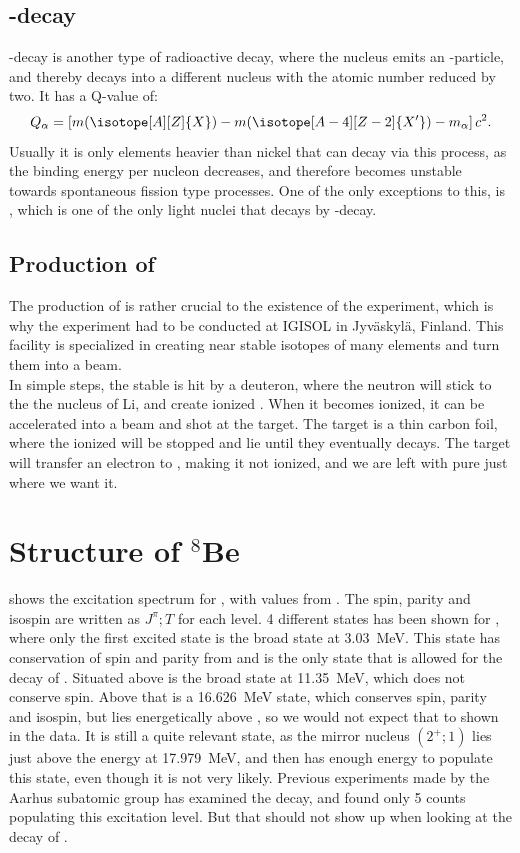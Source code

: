 \subsection{\al-decay}
\al-decay is another type of radioactive decay, where the nucleus emits an \al-particle, and thereby decays into a different nucleus with the atomic number reduced by two.  
It has a Q-value of:
\begin{equation}
Q_\alpha =  \left[ m (\isotope[A][Z]{X}) - m(\isotope[A-4][Z-2]{X'})  	- m_\alpha	 \right] c^2.
\end{equation}
Usually it is only elements heavier than nickel that can decay via this process, as the binding energy per nucleon decreases, and therefore becomes unstable towards spontaneous fission type processes. 
One of the only exceptions to this, is \ber, which is one of the only light nuclei that decays by \al-decay.

\subsection{Production of \li}
The production of \li is rather crucial to the existence of the experiment, which is why the experiment had to be conducted at IGISOL in Jyväskylä, Finland. This facility is specialized in creating near stable isotopes of many elements and turn them into a beam. \\
In simple steps, the stable  is hit by a deuteron, where the neutron will stick to the the nucleus of \isotope[7]Li, and create ionized \li. When it becomes ionized, it can be accelerated into a beam and shot at the target. The target is a thin carbon foil, where the ionized \li will be stopped and lie until they eventually decays. The target will transfer an electron to \li, making it not ionized, and we are left with pure \li just where we want it.  

\section{Structure of $^8$Be}
 shows the excitation spectrum for \ber, with values from \cite{TILLEY2004155}. The spin, parity and isospin are written as $J^\pi ; T$ for each level. 4 different states has been shown for \ber, where only the first excited state is the broad state at \SI{3.03}{MeV}. This state has conservation of spin and parity from \li and is the only state that is allowed for the decay of \li. Situated above is the broad state at \SI{11.35}{MeV}, which does not conserve spin. Above that is a \SI{16.626}{MeV} state, which conserves spin, parity and isospin, but lies energetically above \li, so we would not expect that to shown in the data. It is still a quite relevant state, as the mirror nucleus  $(2^+; 1)$ lies just above the energy at \SI{17.979}{MeV}, and then has enough energy to populate this state, even though it is not very likely. Previous experiments made by the Aarhus subatomic group has examined the decay, and found only 5 counts populating this excitation level. But that should not show up when looking at the decay of \li.


